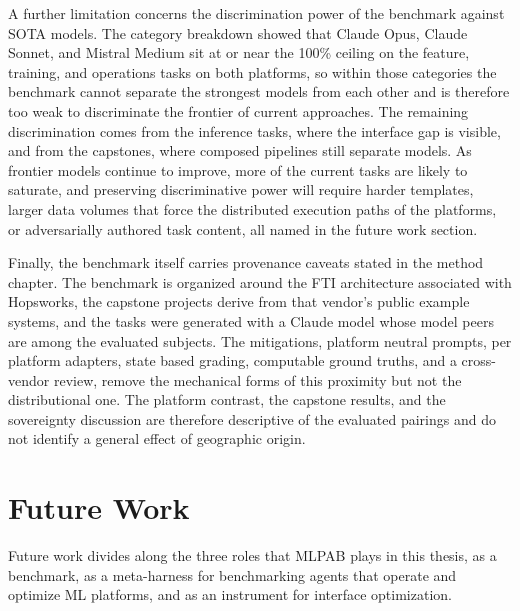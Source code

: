 \documentclass[
english,                 %
bibtex,                  %
]{kththesis}
\numberwithin{listing}{chapter}
\begin{document}
A further limitation concerns the discrimination power of the benchmark against \gls{SOTA} models. The category breakdown showed that Claude Opus, Claude Sonnet, and Mistral Medium sit at or near the 100\% ceiling on the feature, training, and operations tasks on both platforms, so within those categories the benchmark cannot separate the strongest models from each other and is therefore too weak to discriminate the frontier of current approaches. The remaining discrimination comes from the inference tasks, where the interface gap is visible, and from the capstones, where composed pipelines still separate models. As frontier models continue to improve, more of the current tasks are likely to saturate, and preserving discriminative power will require harder templates, larger data volumes that force the distributed execution paths of the platforms, or adversarially authored task content, all named in the future work section.

Finally, the benchmark itself carries provenance caveats stated in the method chapter. The benchmark is organized around the \gls{FTI} architecture associated with Hopsworks, the capstone projects derive from that vendor's public example systems, and the tasks were generated with a Claude model whose model peers are among the evaluated subjects. The mitigations, platform neutral prompts, per platform adapters, state based grading, computable ground truths, and a cross-vendor review, remove the mechanical forms of this proximity but not the distributional one. The platform contrast, the capstone results, and the sovereignty discussion are therefore descriptive of the evaluated pairings and do not identify a general effect of geographic origin.

\section{Future Work}
\label{sec:concl_future_work}
\glsresetall

Future work divides along the three roles that \gls{MLPAB} plays in this thesis, as a benchmark, as a meta-harness for benchmarking agents that operate and optimize \gls{ML} platforms, and as an instrument for interface optimization.
\end{document}
